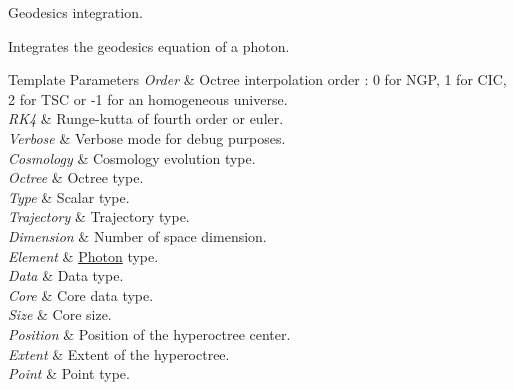 Geodesics integration. 

Integrates the geodesics equation of a photon. 
\begin{DoxyTemplParams}{Template Parameters}
{\em Order} & Octree interpolation order \-: 0 for N\-G\-P, 1 for C\-I\-C, 2 for T\-S\-C or -\/1 for an homogeneous universe. \\
\hline
{\em R\-K4} & Runge-\/kutta of fourth order or euler. \\
\hline
{\em Verbose} & Verbose mode for debug purposes. \\
\hline
{\em Cosmology} & Cosmology evolution type. \\
\hline
{\em Octree} & Octree type. \\
\hline
{\em Type} & Scalar type. \\
\hline
{\em Trajectory} & Trajectory type. \\
\hline
{\em Dimension} & Number of space dimension. \\
\hline
{\em Element} & \hyperlink{exceptionPhoton}{Photon} type. \\
\hline
{\em Data} & Data type. \\
\hline
{\em Core} & Core data type. \\
\hline
{\em Size} & Core size. \\
\hline
{\em Position} & Position of the hyperoctree center. \\
\hline
{\em Extent} & Extent of the hyperoctree. \\
\hline
{\em Point} & Point type. \\
\hline
\end{DoxyTemplParams}

